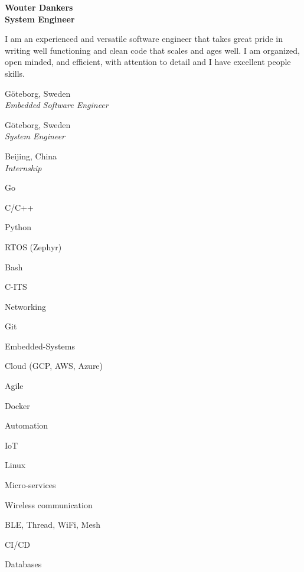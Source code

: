 \documentclass[a4paper,12pt,final]{memoir}
\begin{document}
\Huge\bfseries {\color{RoyalBlue} Wouter Dankers} \\
\Large\bfseries  System Engineer \\

\normalsize\normalfont

\begin{AboutMe}
I am an experienced and versatile software engineer that takes great pride in writing well functioning and clean code that scales and ages well. I am organized, open minded, and efficient, with attention to detail and I have excellent people skills.

\end{AboutMe}

 \hfill G\"oteborg, Sweden \\
\emph{Embedded Software Engineer}
\SmallSep

 \hfill G\"oteborg, Sweden \\
\emph{System Engineer}
\SmallSep

 \hfill Beijing, China \\
\emph{Internship}
\Sep

\begin{multicols}{3}
\begin{compactitem}[\color{RoyalBlue}$\circ$]
	\item Go
	\item C/C++ 
	\item Python
	\item RTOS (Zephyr) 
	\item Bash
	\item C-ITS
	\item Networking
	\item Git
	\item Embedded-Systems
	\item Cloud (GCP, AWS, Azure)
	\item Agile 
	\item Docker
	\item Automation
	\item IoT
	\item Linux
	\item Micro-services
	\item Wireless communication
	\item BLE, Thread, WiFi, Mesh
	\item CI/CD
	\item Databases
\end{compactitem}
\end{multicols}
\Sep
\end{document}
